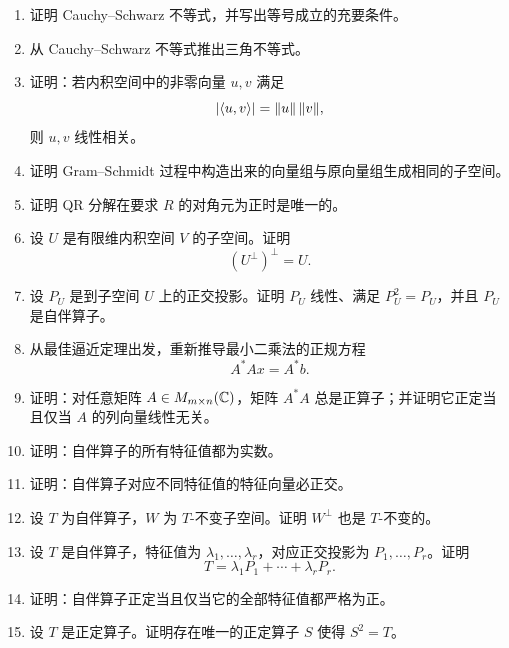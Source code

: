 \begin{enumerate}[label=\textbf{5.\arabic*.},start=26]
  \item \medium 证明 Cauchy--Schwarz 不等式，并写出等号成立的充要条件。

  \item \medium 从 Cauchy--Schwarz 不等式推出三角不等式。

  \item \medium 证明：若内积空间中的非零向量 $u,v$ 满足
  \[
  |\langle u, v \rangle|=\|u\|\,\|v\|,
  \]
  则 $u,v$ 线性相关。

  \item \medium 证明 Gram--Schmidt 过程中构造出来的向量组与原向量组生成相同的子空间。

  \item \medium 证明 QR 分解在要求 $R$ 的对角元为正时是唯一的。

  \item \medium 设 $U$ 是有限维内积空间 $V$ 的子空间。证明
  \[
  (U^{\perp})^{\perp}=U.
  \]

  \item \medium 设 $P_U$ 是到子空间 $U$ 上的正交投影。证明 $P_U$ 线性、满足 $P_U^2=P_U$，并且 $P_U$ 是自伴算子。

  \item \medium 从最佳逼近定理出发，重新推导最小二乘法的正规方程
  \[
  A^*Ax=A^*b.
  \]

  \item \medium 证明：对任意矩阵 $A\in M_{m\times n}(\mathbb{C})$，矩阵 $A^*A$ 总是正算子；并证明它正定当且仅当 $A$ 的列向量线性无关。

  \item \medium 证明：自伴算子的所有特征值都为实数。

  \item \medium 证明：自伴算子对应不同特征值的特征向量必正交。

  \item \medium 设 $T$ 为自伴算子，$W$ 为 $T$-不变子空间。证明 $W^{\perp}$ 也是 $T$-不变的。

  \item \medium 设 $T$ 是自伴算子，特征值为 $\lambda_1,\dots,\lambda_r$，对应正交投影为 $P_1,\dots,P_r$。证明
  \[
  T=\lambda_1P_1+\cdots+\lambda_rP_r.
  \]

  \item \medium 证明：自伴算子正定当且仅当它的全部特征值都严格为正。

  \item \medium 设 $T$ 是正定算子。证明存在唯一的正定算子 $S$ 使得 $S^2=T$。


\end{enumerate}
